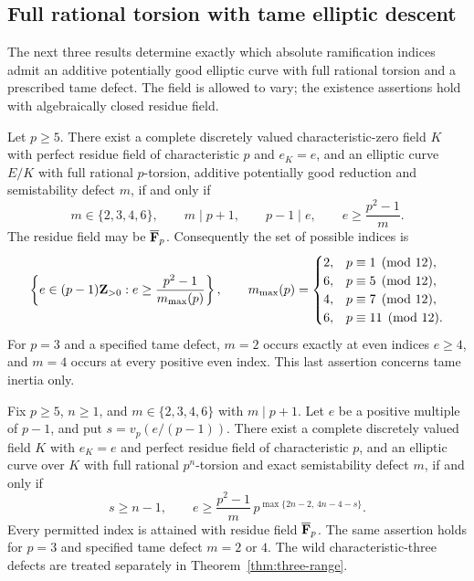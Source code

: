 \subsection{Full rational torsion with tame elliptic descent}
The next three results determine exactly which absolute ramification indices admit an additive potentially good elliptic curve with full rational torsion and a prescribed tame defect. The field is allowed to vary; the existence assertions hold with algebraically closed residue field.

\begin{theorem}\label{thm:tame-level-one}
Let $p\ge5$. There exist a complete discretely valued characteristic-zero field $K$ with perfect residue field of characteristic $p$ and $e_K=e$, and an elliptic curve $E/K$ with full rational $p$-torsion, additive potentially good reduction and semistability defect $m$, if and only if
\begin{equation}\label{eq:tame-first-criterion}
 m\in\{2,3,4,6\},\qquad m\mid p+1,\qquad p-1\mid e,
 \qquad e\ge\frac{p^2-1}{m}.
\end{equation}
The residue field may be $\overline{\mathbf F}_p$. Consequently the set of possible indices is
\[
 \left\{e\in(p-1)\mathbf Z_{>0}:e\ge\frac{p^2-1}{m_{\max}(p)}\right\},
 \qquad
 m_{\max}(p)=
 \begin{cases}
 2,&p\equiv1\pmod{12},\\
 6,&p\equiv5\pmod{12},\\
 4,&p\equiv7\pmod{12},\\
 6,&p\equiv11\pmod{12}.
 \end{cases}
\]
For $p=3$ and a specified tame defect, $m=2$ occurs exactly at even indices $e\ge4$, and $m=4$ occurs at every positive even index. This last assertion concerns tame inertia only.
\end{theorem}

\begin{theorem}\label{thm:tame-full-level}
Fix $p\ge5$, $n\ge1$, and $m\in\{2,3,4,6\}$ with $m\mid p+1$. Let $e$ be a positive multiple of $p-1$, and put $s=v_p(e/(p-1))$. There exist a complete discretely valued field $K$ with $e_K=e$ and perfect residue field of characteristic $p$, and an elliptic curve over $K$ with full rational $p^n$-torsion and exact semistability defect $m$, if and only if
\begin{equation}\label{eq:tame-full-criterion}
 s\ge n-1,\qquad
 e\ge\frac{p^2-1}{m}\,
       p^{\max\{2n-2,\,4n-4-s\}}.
\end{equation}
Every permitted index is attained with residue field $\overline{\mathbf F}_p$.
The same assertion holds for $p=3$ and specified tame defect $m=2$ or $4$. The wild characteristic-three defects are treated separately in Theorem~\ref{thm:three-range}.
\end{theorem}

